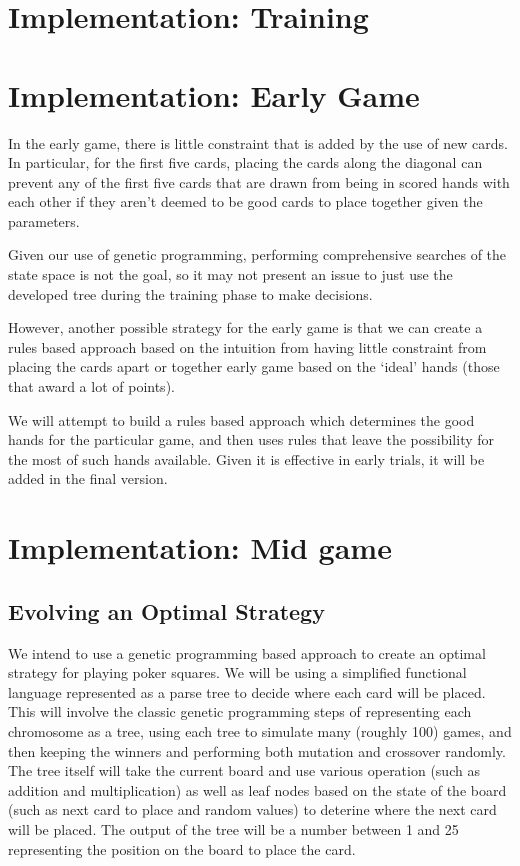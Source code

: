 \documentclass[twoside]{article}
\begin{document}
\begin{multicols}{2}

\section{Implementation: Training}



\section{Implementation: Early Game}
In the early game, there is little constraint that is added by the use of new cards. In particular, for the first five cards, placing the cards along the diagonal can prevent any of the first five cards that are drawn from being in scored hands with each other if they aren't deemed to be good cards to place together given the parameters.

Given our use of genetic programming, performing comprehensive searches of the state space is not the goal, so it may not present an issue to just use the developed tree during the training phase to make decisions.

However, another possible strategy for the early game is that we can create a rules based approach based on the intuition from having little constraint from placing the cards apart or together early game based on the `ideal' hands (those that award a lot of points).

We will attempt to build a rules based approach which determines the good hands for the particular game, and then uses rules that leave the possibility for the most of such hands available. Given it is effective in early trials, it will be added in the final version.

\section{Implementation: Mid game}

\subsection{Evolving an Optimal Strategy}
We intend to use a genetic programming based approach to create an optimal strategy for playing poker squares. We will be using a simplified functional language represented as a parse tree to decide where each card will be placed. This will involve the classic genetic programming steps of representing each chromosome as a tree, using each tree to simulate many (roughly 100) games, and then keeping the winners and performing both mutation and crossover randomly. The tree itself will take the current board and use various operation (such as addition and multiplication) as well as leaf nodes based on the state of the board (such as next card to place and random values) to deterine where the next card will be placed. The output of the tree will be a number between 1 and 25 representing the position on the board to place the card. 


\end{multicols}
\end{document}
